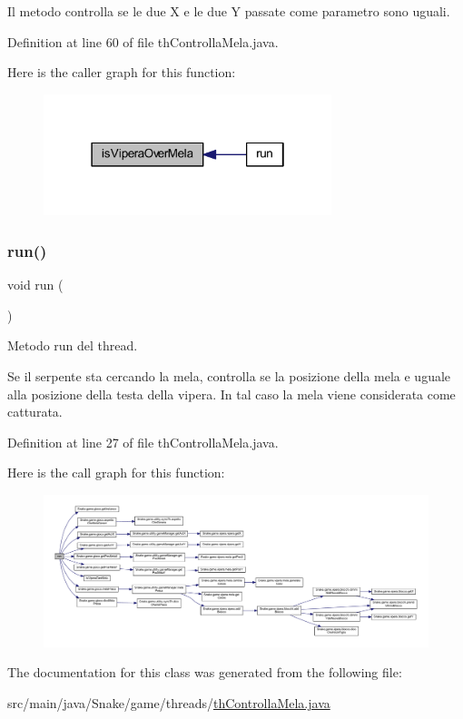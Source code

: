 Il metodo controlla se le due X e le due Y passate come parametro sono uguali. 



Definition at line 60 of file th\+Controlla\+Mela.\+java.

Here is the caller graph for this function\+:
\nopagebreak
\begin{figure}[H]
\begin{center}
\leavevmode
\includegraphics[width=238pt]{class_snake_1_1game_1_1threads_1_1th_controlla_mela_a8b1e3878460295cc10e070af8d1f1297_icgraph}
\end{center}
\end{figure}
\mbox{\label{class_snake_1_1game_1_1threads_1_1th_controlla_mela_a13a43e6d814de94978c515cb084873b1}} 
\subsubsection{\texorpdfstring{run()}{run()}}
{\footnotesize\ttfamily void run (\begin{DoxyParamCaption}{ }\end{DoxyParamCaption})}



Metodo run del thread. 

Se il serpente sta cercando la mela, controlla se la posizione della mela e\textquotesingle{} uguale alla posizione della testa della vipera. In tal caso la mela viene considerata come catturata. 

Definition at line 27 of file th\+Controlla\+Mela.\+java.

Here is the call graph for this function\+:
\nopagebreak
\begin{figure}[H]
\begin{center}
\leavevmode
\includegraphics[width=350pt]{class_snake_1_1game_1_1threads_1_1th_controlla_mela_a13a43e6d814de94978c515cb084873b1_cgraph}
\end{center}
\end{figure}


The documentation for this class was generated from the following file\+:\begin{DoxyCompactItemize}
\item 
src/main/java/\+Snake/game/threads/\mbox{\hyperlink{th_controlla_mela_8java}{th\+Controlla\+Mela.\+java}}\end{DoxyCompactItemize}
